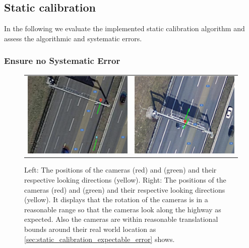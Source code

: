 
\subsection{Static calibration}
In the following we evaluate the implemented static calibration algorithm and assess the algorithmic and systematic errors.

\subsubsection{Ensure no Systematic Error}

\begin{figure}[t]
    \centering
    \begin{tabular}{cc}
      \includegraphics[width=0.45 \linewidth]{images/calibration/google_maps_s50_s.png} &
      \includegraphics[width=0.45 \linewidth]{images/calibration/google_maps_s40_n.png} 
  \end{tabular}
  \caption{Left: The positions of the cameras  (red) and  (green) and their respective looking directions (yellow). 
  Right: The positions of the cameras  (red) and  (green) and their respective looking directions (yellow). 
  It displays that the rotation of the cameras is in a reasonable range so that the cameras look along the highway as expected. 
  Also the cameras are within reasonable translational bounds around their real world location as \autoref{sec:static_calibration_expectable_error} shows.
  }
  \label{fig:google_maps}
  \end{figure}

